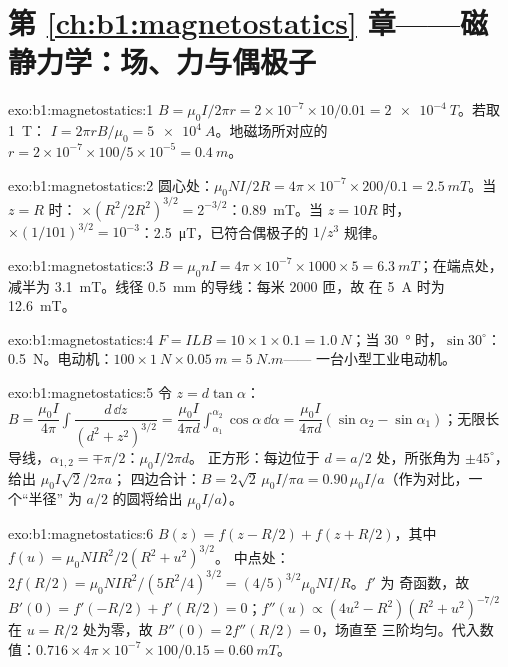 \section*{第 \ref{ch:b1:magnetostatics} 章——磁静力学：场、力与偶极子}

\begin{solution}{exo:b1:magnetostatics:1}
$B = \mu_0I/2\pi r = 2 \times 10^{-7} \times 10/0.01 = \qty{2e-4}{T}$。若取 \qty{1}{T}：
$I = 2\pi rB/\mu_0 = \qty{5e4}{A}$。地磁场所对应的 $r = 2 \times 10^{-7} \times
100/5 \times 10^{-5} = \qty{0.4}{m}$。
\end{solution}

\begin{solution}{exo:b1:magnetostatics:2}
圆心处：$\mu_0NI/2R = 4\pi \times 10^{-7} \times 200/0.1 = \qty{2.5}{mT}$。当 $z = R$ 时：
$\times(R^2/2R^2)^{3/2} = 2^{-3/2}$：\qty{0.89}{mT}。当 $z = 10R$ 时，$\times(1/101)^{3/2}
= 10^{-3}$：\qty{2.5}{\micro T}，已符合偶极子的 $1/z^3$ 规律。
\end{solution}

\begin{solution}{exo:b1:magnetostatics:3}
$B = \mu_0nI = 4\pi \times 10^{-7} \times 1000 \times 5 = \qty{6.3}{mT}$；在端点处，
减半为 \qty{3.1}{mT}。线径 \qty{0.5}{mm} 的导线：每米 $2000$ 匝，故
在 \qty{5}{A} 时为 \qty{12.6}{mT}。
\end{solution}

\begin{solution}{exo:b1:magnetostatics:4}
$F = ILB = 10 \times 1 \times 0.1 = \qty{1.0}{N}$；当 \qty{30}{\degree} 时，$\sin30^\circ$：
\qty{0.5}{N}。电动机：$100 \times \qty{1}{N} \times \qty{0.05}{m} = \qty{5}{N.m}$——
一台小型工业电动机。
\end{solution}

\begin{solution}{exo:b1:magnetostatics:5}
令 $z = d\tan\alpha$：$B = \dfrac{\mu_0I}{4\pi}\displaystyle\int\dfrac{d\,\dd z}{(d^2 + z^2)^{3/2}}
= \dfrac{\mu_0I}{4\pi d}\displaystyle\int_{\alpha_1}^{\alpha_2}\cos\alpha\,\dd\alpha = \dfrac{\mu_0I}{4\pi d}
(\sin\alpha_2 - \sin\alpha_1)$；无限长导线，$\alpha_{1,2} = \mp\pi/2$：$\mu_0I/2\pi d$。
正方形：每边位于 $d = a/2$ 处，所张角为 $\pm45^\circ$，给出 $\mu_0I\sqrt2/2\pi a$；
四边合计：$B = 2\sqrt2\,\mu_0I/\pi a = 0.90\,\mu_0I/a$（作为对比，一个“半径”
为 $a/2$ 的圆将给出 $\mu_0I/a$）。
\end{solution}

\begin{solution}{exo:b1:magnetostatics:6}
$B(z) = f(z - R/2) + f(z + R/2)$，其中 $f(u) = \mu_0NIR^2/2(R^2 + u^2)^{3/2}$。
中点处：$2f(R/2) = \mu_0NIR^2/(5R^2/4)^{3/2} = (4/5)^{3/2}\mu_0NI/R$。$f'$ 为
奇函数，故 $B'(0) = f'(-R/2) + f'(R/2) = 0$；$f''(u) \propto (4u^2 - R^2)(R^2 +
u^2)^{-7/2}$ 在 $u = R/2$ 处为零，故 $B''(0) = 2f''(R/2) = 0$，场直至
三阶均匀。代入数值：$0.716 \times 4\pi \times 10^{-7} \times 100/0.15 =
\qty{0.60}{mT}$。
\end{solution}

